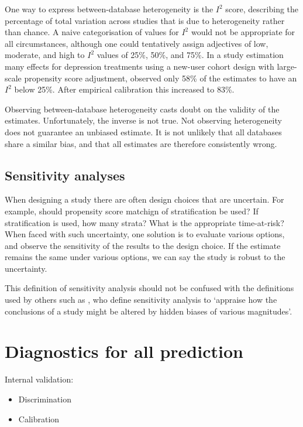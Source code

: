 \documentclass[]{book}
\providecommand{\tightlist}{%
  \setlength{\itemsep}{0pt}\setlength{\parskip}{0pt}}
\let\BeginKnitrBlock\begin \let\EndKnitrBlock\end
\begin{document}
One way to express between-database heterogeneity is the \(I^2\) score,
describing the percentage of total variation across studies that is due
to heterogeneity rather than chance. \citep{higgins_2003} A naive
categorisation of values for \(I^2\) would not be appropriate for all
circumstances, although one could tentatively assign adjectives of low,
moderate, and high to \(I^2\) values of 25\%, 50\%, and 75\%. In a study
estimation many effects for depression treatments using a new-user
cohort design with large-scale propensity score adjustment,
\citet{schuemie_2018b} observed only 58\% of the estimates to have an
\(I^2\) below 25\%. After empirical calibration this increased to 83\%.

\BeginKnitrBlock{rmdimportant}
Observing between-database heterogeneity casts doubt on the validity of
the estimates. Unfortunately, the inverse is not true. Not observing
heterogeneity does not guarantee an unbiased estimate. It is not
unlikely that all databases share a similar bias, and that all estimates
are therefore consistently wrong.
\EndKnitrBlock{rmdimportant}

\subsection{Sensitivity analyses}\label{sensitivity-analyses}

When designing a study there are often design choices that are
uncertain. For example, should propensity score matchign of
stratification be used? If stratification is used, how many strata? What
is the appropriate time-at-risk? When faced with such uncertainty, one
solution is to evaluate various options, and observe the sensitivity of
the results to the design choice. If the estimate remains the same under
various options, we can say the study is robust to the uncertainty.

This definition of sensitivity analysis should not be confused with the
definitions used by others such as \citet{rosenbaum_2005}, who define
sensitivity analysis to `appraise how the conclusions of a study might
be altered by hidden biases of various magnitudes'.

\section{Diagnostics for all
prediction}\label{diagnostics-for-all-prediction}

Internal validation:

\begin{itemize}
\tightlist
\item
  Discrimination
\item
  Calibration
\end{itemize}
\end{document}
